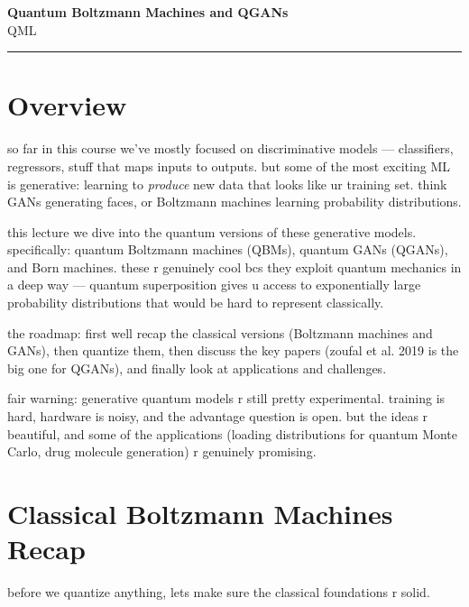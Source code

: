 \documentclass[11pt,a4paper]{article}
\theoremstyle{definition}
\theoremstyle{remark}
\begin{document}
\begin{center}
    {\LARGE \textbf{Quantum Boltzmann Machines and QGANs}}\\[8pt]
    {\large QML}\\[12pt]
    \hrule
\end{center}

\vspace{12pt}
\tableofcontents
\newpage

\section{Overview}

so far in this course we've mostly focused on discriminative models --- classifiers, regressors, stuff that maps inputs to outputs. but some of the most exciting ML is generative: learning to \emph{produce} new data that looks like ur training set. think GANs generating faces, or Boltzmann machines learning probability distributions.

this lecture we dive into the quantum versions of these generative models. specifically: quantum Boltzmann machines (QBMs), quantum GANs (QGANs), and Born machines. these r genuinely cool bcs they exploit quantum mechanics in a deep way --- quantum superposition gives u access to exponentially large probability distributions that would be hard to represent classically.

the roadmap: first well recap the classical versions (Boltzmann machines and GANs), then quantize them, then discuss the key papers (zoufal et al. 2019 is the big one for QGANs), and finally look at applications and challenges.

fair warning: generative quantum models r still pretty experimental. training is hard, hardware is noisy, and the advantage question is open. but the ideas r beautiful, and some of the applications (loading distributions for quantum Monte Carlo, drug molecule generation) r genuinely promising.

\section{Classical Boltzmann Machines Recap}

before we quantize anything, lets make sure the classical foundations r solid.
\end{document}
